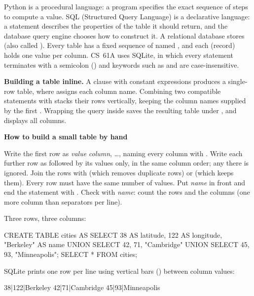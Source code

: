 \documentclass[10pt]{scrartcl}
\newenvironment{howto}[1]{\begin{mdframed}[style=howtostyle]{\color{NavyBlue}\textbf{#1}}\par\vspace{2pt}}{\end{mdframed}}
\begin{document}
Python is a procedural language: a program specifies the exact sequence of steps to compute a value. SQL (Structured Query Language) is a declarative language: a statement describes the properties of the table it should return, and the database query engine chooses how to construct it. A relational database stores  (also called ). Every table has a fixed sequence of named , and each  (record) holds one value per column. CS~61A uses SQLite, in which every statement terminates with a semicolon (\cd{;}) and keywords such as  and  are case-insensitive.

\medskip\noindent\textbf{Building a table inline.} A  clause with constant expressions produces a single-row table, where  assigns each column name. Combining two compatible  statements with  stacks their rows vertically, keeping the column names supplied by the first . Wrapping the query inside  saves the resulting table under , and  displays all columns.

\begin{howto}{How to build a small table by hand}
\begin{steps}
  \ii Write the first row as  \emph{value}  \emph{column}, \dots, naming every column with .
  \ii Write each further row as  followed by its values only, in the same column order; any  there is ignored.
  \ii Join the rows with  (which removes duplicate rows) or  (which keeps them). Every row must have the same number of values.
  \ii Put  \emph{name}  in front and end the statement with \cd{;}.
  \ii Check with  \emph{name}\cd{;}: count the rows and the columns (one more column than \cd{|} separators per line).
\end{steps}
\end{howto}

\begin{example*}
Three rows, three columns:
\begin{sql}
CREATE TABLE cities AS
  SELECT 38 AS latitude, 122 AS longitude, "Berkeley" AS name UNION
  SELECT 42,             71,               "Cambridge"        UNION
  SELECT 45,             93,               "Minneapolis";
SELECT * FROM cities;
\end{sql}
SQLite prints one row per line using vertical bars (\cd{|}) between column values:
\begin{plain}
38|122|Berkeley
42|71|Cambridge
45|93|Minneapolis
\end{plain}
\end{example*}
\end{document}
